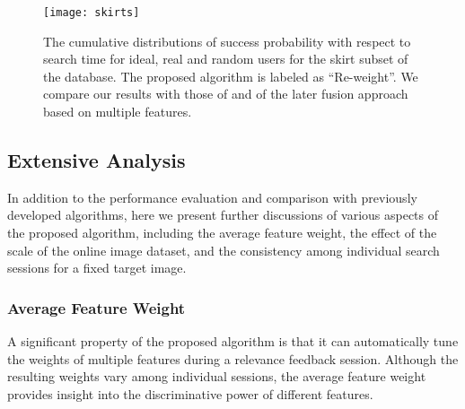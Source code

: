 \documentclass[journal]{IEEEtran}
\begin{document}
\begin{figure}[!t]
\centering
\texttt{[image: skirts]}
\caption{The cumulative distributions of success probability with respect to search time for ideal, real and random users for the skirt subset of the database. The proposed algorithm is labeled as ``Re-weight''. We compare our results with those of \cite{fang2005experiments} and of the later fusion approach based on multiple features. }
\label{fig::flow4}
\end{figure}







\subsection{Extensive Analysis}
In addition to the performance evaluation and comparison with previously developed algorithms, here we present further discussions of various aspects of the proposed algorithm, including the average feature weight, the effect of the scale of the online image dataset, and the consistency among individual search sessions for a fixed target image.


\subsubsection{Average Feature Weight}
A significant property of the proposed algorithm is that it can automatically tune the weights of multiple features during a relevance feedback session. Although the resulting weights vary among individual sessions, the average feature weight provides insight into the discriminative power of different features.
\end{document}
